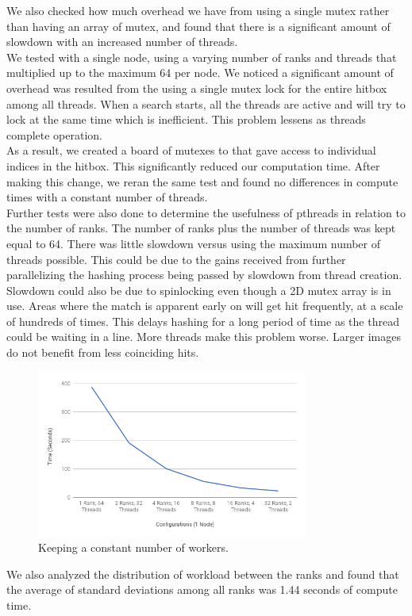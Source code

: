 \documentclass[10pt, journal]{vgtc}                %
\newcommand\tab[1][1cm]{\hspace*{#1}}
\begin{document}
\begin{flushleft}
\tab We also checked how much overhead we have from using a single mutex rather than having an array of mutex, and found that there is a significant amount of slowdown with an increased number of threads. \\\smallskip
We tested with a single node, using a varying number of ranks and threads that multiplied up to the maximum 64 per node. We noticed a significant amount of overhead was resulted from the using a single mutex lock for the entire hitbox among all threads. When a search starts, all the threads are active and will try to lock at the same time which is inefficient. This problem lessens as threads complete operation.\\\smallskip
\tab As a result, we created a board of mutexes to that gave access to individual indices in the hitbox. This significantly reduced our computation time. After making this change, we reran the same test and found no differences in compute times with a constant number of threads. \\\smallskip
\tab Further tests were also done to determine the usefulness of pthreads in relation to the number of ranks. The number of ranks plus the number of threads was kept equal to 64. There was little slowdown versus using the maximum number of threads possible. This could be due to the gains received from further parallelizing the hashing process being passed by slowdown from thread creation. Slowdown could also be due to spinlocking even though a 2D mutex array is in use. Areas where the match is apparent early on will get hit frequently, at a scale of hundreds of times. This delays hashing for a long period of time as the thread could be waiting in a line. More threads make this problem worse. Larger images do not benefit from less coinciding hits.\\\smallskip
	\begin{figure}[h!]
		\centering
		\includegraphics[width=3.5in]{64.png}
		\caption{Keeping a constant number of workers.}
	\end{figure}
\tab We also analyzed the distribution of workload between the ranks and found that the average of standard deviations among all ranks was 1.44 seconds of compute time. 
\end{flushleft}
\end{document}

